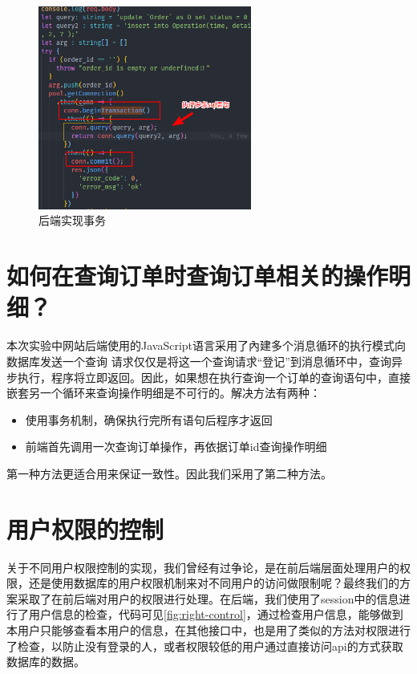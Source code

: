 \documentclass{myreport}
\begin{document}
\begin{figure}[htp]
    \centering
    \includegraphics[width=7cm]{figure/2018-12-22-12-35-08.png}
    \caption{后端实现事务}
    \label{fig:dev-transaction-1}
\end{figure}

\section{如何在查询订单时查询订单相关的操作明细？}

本次实验中网站后端使用的JavaScript语言采用了內建多个消息循环的执行模式向数据库发送一个查询
请求仅仅是将这一个查询请求“登记”到消息循环中，查询异步执行，程序将立即返回。因此，如果想在执行查询一个订单的查询语句中，直接嵌套另一个循环来查询操作明细是不可行的。解决方法有两种：

\begin{itemize}
    \item 使用事务机制，确保执行完所有语句后程序才返回
    \item 前端首先调用一次查询订单操作，再依据订单id查询操作明细
\end{itemize}

第一种方法更适合用来保证一致性。因此我们采用了第二种方法。


\section{用户权限的控制}

关于不同用户权限控制的实现，我们曾经有过争论，是在前后端层面处理用户的权限，还是使用数据库的用户权限机制来对不同用户的访问做限制呢？最终我们的方案采取了在前后端对用户的权限进行处理。在后端，我们使用了session中的信息进行了用户信息的检查，代码可见\autoref{fig:right-control}，通过检查用户信息，能够做到本用户只能够查看本用户的信息，在其他接口中，也是用了类似的方法对权限进行了检查，以防止没有登录的人，或者权限较低的用户通过直接访问api的方式获取数据库的数据。
\end{document}
